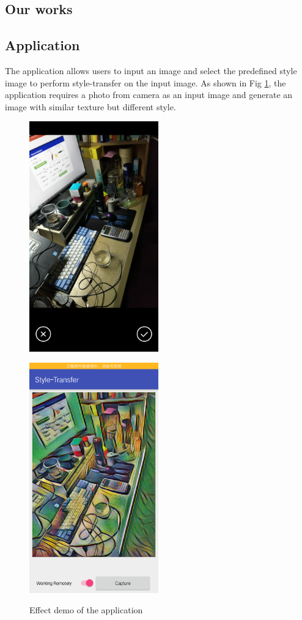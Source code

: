 \documentclass[a4paper,12pt,onecolumn,twoside]{article}
\begin{document}
\begin{CJK*}{GBK}{song}
\section{Our works}
\subsection{Application}
The application allows users to input an image and select the predefined
style image to perform style-transfer on the input image. 
As shown in Fig \ref{fig:transfer}, the application requires
a photo from camera as an input image and generate an image with
similar texture but different style.


\begin{figure}[!hbt]
  \begin{minipage}[t]{0.5\linewidth}
    \centering
    \includegraphics[width=2.2in]{origin}
    \label{fig:origin}
    \end{minipage}
    \begin{minipage}[t]{0.5\linewidth}
    \centering
    \includegraphics[width=2.2in]{transfer}
    \label{fig:transfer}
  \end{minipage}
  \caption{Effect demo of the application}
\end{figure}


\end{CJK*}
\end{document}
